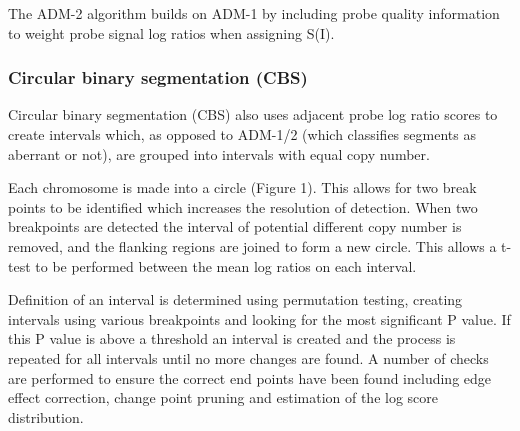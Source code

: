 The ADM-2 algorithm builds on ADM-1 by including probe quality information to weight probe signal log ratios when assigning S(I).




\subsubsection{Circular binary segmentation (\ac{CBS})}
Circular binary segmentation (\ac{CBS}) also uses adjacent probe log ratio scores to create intervals which, as opposed to ADM-1/2 (which classifies segments as aberrant or not), are grouped into intervals with equal copy number. 

Each chromosome is made into a circle (Figure 1). This allows for two break points to be identified which increases the resolution of detection. When two breakpoints are detected the interval of potential different copy number is removed, and the flanking regions are joined to form a new circle. This allows a t-test to be performed between the mean log ratios on each interval. 

Definition of an interval is determined using permutation testing, creating intervals using various breakpoints and looking for the most significant P value. If this P value is above a threshold an interval is created and the process is repeated for all intervals until no more changes are found.
A number of checks are performed to ensure the correct end points have been found including edge effect correction, change point pruning and estimation of the log score distribution.



